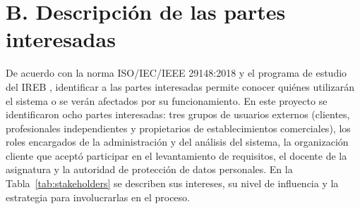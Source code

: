 \documentclass[11pt,a4paper]{article}
\begin{document}
\section*{B. Descripci\'on de las partes interesadas}

De acuerdo con la norma ISO/IEC/IEEE 29148:2018 \cite{iso29148} y el programa de estudio del IREB \cite{ireb2026}, identificar a las partes interesadas permite conocer qui\'enes utilizar\'an el sistema o se ver\'an afectados por su funcionamiento. En este proyecto se identificaron ocho partes interesadas: tres grupos de usuarios externos (clientes, profesionales independientes y propietarios de establecimientos comerciales), los roles encargados de la administraci\'on y del an\'alisis del sistema, la organizaci\'on cliente que acept\'o participar en el levantamiento de requisitos, el docente de la asignatura y la autoridad de protecci\'on de datos personales. En la Tabla~\ref{tab:stakeholders} se describen sus intereses, su nivel de influencia y la estrategia para involucrarlas en el proceso.
\end{document}
